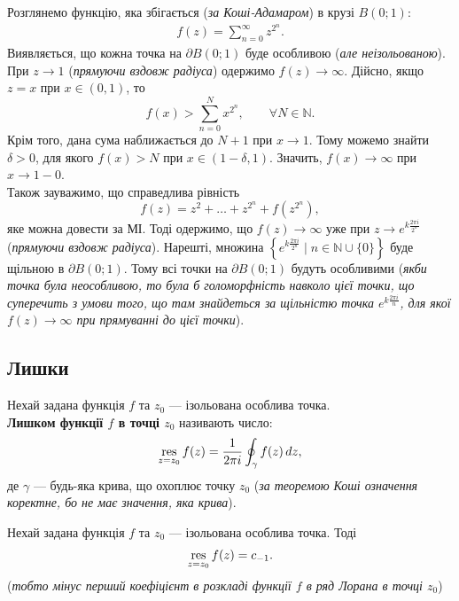 \documentclass{math_library}
\begin{document}
\begin{example}
Розглянемо функцію, яка збігається (\textit{за Коші-Адамаром}) в крузі $B(0;1)$:
\begin{align*}
f(z) = \sum_{n=0}^\infty z^{2^n}.
\end{align*}
Виявляється, що кожна точка на $\partial B(0;1)$ буде особливою (\textit{але неізольованою}).
\bigskip \\
При $z \to 1$ (\textit{прямуючи вздовж радіуса}) одержимо $f(z) \to \infty$. Дійсно, якщо $z = x$ при $x \in (0,1)$, то
\[
f(x) > \sum_{n=0}^N x^{2^n}, \qquad \forall N \in \mathbb{N}.
\]
Крім того, дана сума наближається до $N+1$ при $x \to 1$. Тому можемо знайти $\delta > 0$, для якого $f(x) > N$ при $x \in (1-\delta,1)$. Значить, $f(x) \to \infty$ при $x \to 1-0$.\\
Також зауважимо, що справедлива рівність
\[
f(z) = z^2 + \dots + z^{2^n} + f(z^{2^n}),
\]
яке можна довести за МІ. Тоді одержимо, що $f(z) \to \infty$ уже при $z \to e^{k \frac{2\pi i}{2^n}}$ (\textit{прямуючи вздовж радіуса}). Нарешті, множина $\left\{ e^{k \frac{2\pi i}{2^n}} \mid n \in \mathbb{N} \cup \{0\} \right\}$ буде щільною в $\partial B(0;1)$. Тому всі точки на $\partial B(0;1)$ будуть особливими (\textit{якби точка була неособливою, то була б голоморфність навколо цієї точки, що суперечить з умови того, що там знайдеться за щільністю точка $e^{k \frac{2\pi i}{n}}$, для якої $f(z) \to \infty$ при прямуванні до цієї точки}).
\end{example}

\subsection{Лишки}
\begin{definition}
Нехай задана функція $f$ та $z_0$ --- ізольована особлива точка.\\
\textbf{Лишком функції $f$ в точці $z_0$} називають число:
\begin{align*}
\operatorname*{res}_{z = z_0} f(z) = \dfrac{1}{2 \pi i} \oint_{\gamma} f(z)\,dz,
\end{align*}
де $\gamma$ --- будь-яка крива, що охоплює точку $z_0$ (\textit{за теоремою Коші означення коректне, бо не має значення, яка крива}).
\end{definition}

\begin{proposition}
Нехай задана функція $f$ та $z_0$ --- ізольована особлива точка. Тоді
\begin{align*}
\operatorname*{res}_{z = z_0} f(z) = c_{-1}.
\end{align*}
(\textit{тобто мінус перший коефіцієнт в розкладі функції $f$ в ряд Лорана в точці $z_0$})
\end{proposition}
\end{document}

